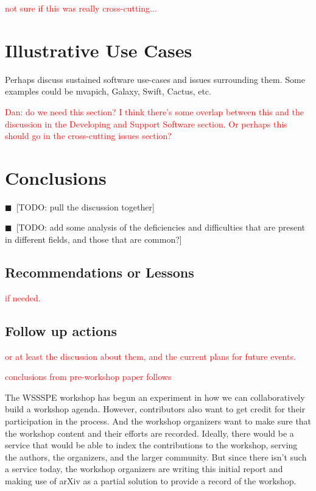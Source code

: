 \documentclass[11pt, oneside]{amsart}
\newcommand{\todo}[1]{{\color{blue}$\blacksquare$~\textsf{[TODO: #1]}}}
\newcommand{\note}[1]{ {\textcolor{red}    { #1 }}}
\begin{document}
\note{not sure if this was really cross-cutting...}


\section{Illustrative Use Cases}

Perhaps discuss sustained software use-cases and issues surrounding them. Some examples could be mvapich, Galaxy, Swift, Cactus, etc.

\note{Dan: do we need this section?  I think there's some overlap between this and the discussion in the Developing and Support Software section.  Or perhaps this should go in the cross-cutting issues section?}

\section{Conclusions}

\todo{pull the discussion together}

\todo{add some analysis of the deficiencies and difficulties that are present in different fields, and those that are common?}

\subsection{Recommendations or Lessons}

\note{if needed.}

\subsection{Follow up actions}

\note{or at least the discussion about them, and the current plans for future events.}

\note{conclusions from pre-workshop paper follows}

The WSSSPE workshop has begun an experiment in how we can collaboratively build a workshop 
agenda. However, contributors also want to get credit for their participation in the process. And the 
workshop organizers want to make sure that the workshop content and their efforts are recorded. 
Ideally, there would be a service that would be able to index the contributions to the workshop, 
serving the authors, the organizers, and the larger community. But since there isn't such a service 
today, the workshop organizers are writing this initial report and making use of arXiv as a partial 
solution to provide a record of the workshop.
\end{document}
